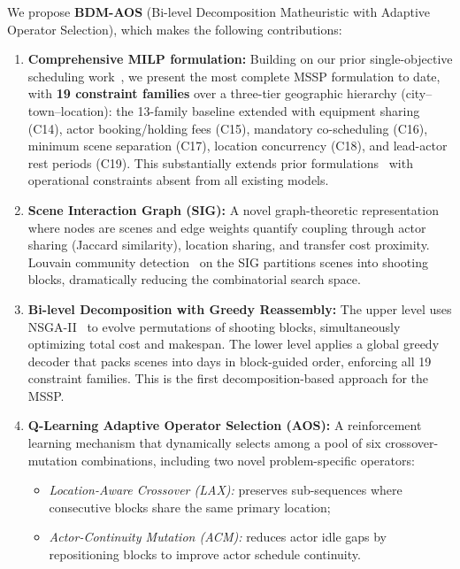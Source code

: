 We propose \textbf{BDM-AOS} (Bi-level Decomposition Matheuristic with Adaptive Operator Selection), which makes the following contributions:

\begin{enumerate}
    \item \textbf{Comprehensive MILP formulation:} Building on our prior single-objective scheduling work~\citep{vjlaxmi2024}, we present the most complete MSSP formulation to date, with \textbf{19 constraint families} over a three-tier geographic hierarchy (city--town--location): the 13-family baseline extended with equipment sharing (C14), actor booking/holding fees (C15), mandatory co-scheduling (C16), minimum scene separation (C17), location concurrency (C18), and lead-actor rest periods (C19).
    This substantially extends prior formulations~\citep{liu2019, tekin2023} with operational constraints absent from all existing models.

    \item \textbf{Scene Interaction Graph (SIG):} A novel graph-theoretic representation where nodes are scenes and edge weights quantify coupling through actor sharing (Jaccard similarity), location sharing, and transfer cost proximity. Louvain community detection~\citep{blondel2008} on the SIG partitions scenes into shooting blocks, dramatically reducing the combinatorial search space.

    \item \textbf{Bi-level Decomposition with Greedy Reassembly:} The upper level uses NSGA-II~\citep{deb2002} to evolve permutations of shooting blocks, simultaneously optimizing total cost and makespan. The lower level applies a global greedy decoder that packs scenes into days in block-guided order, enforcing all 19 constraint families. This is the first decomposition-based approach for the MSSP.

    \item \textbf{Q-Learning Adaptive Operator Selection (AOS):} A reinforcement learning mechanism that dynamically selects among a pool of six crossover-mutation combinations, including two novel problem-specific operators:
    \begin{itemize}
        \item \emph{Location-Aware Crossover (LAX):} preserves sub-sequences where consecutive blocks share the same primary location;
        \item \emph{Actor-Continuity Mutation (ACM):} reduces actor idle gaps by repositioning blocks to improve actor schedule continuity.
    \end{itemize}


\end{enumerate}
